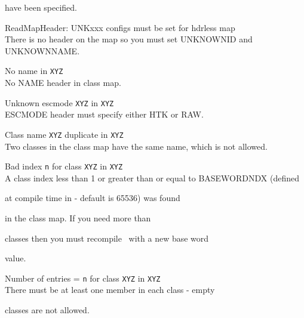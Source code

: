\begin{itemize}
\begin{itemize}
        have been specified.





 ReadMapHeader: UNKxxx configs must be set for hdrless map\\


        There is no header on the map so you must set UNKNOWNID and UNKNOWNNAME.





 No name in \texttt{XYZ}\\


        No NAME header in class map.





 Unknown escmode \texttt{XYZ} in \texttt{XYZ}\\


        ESCMODE header must specify either HTK or RAW.





 Class name  \texttt{XYZ} duplicate in \texttt{XYZ}\\


        Two classes in the class map have the same name, which is not allowed.





 Bad index \texttt{n} for class \texttt{XYZ} in \texttt{XYZ}\\


        A class index less than 1 or greater than or equal to BASEWORDNDX (defined


        at compile time in  - default is 65536) was found


        in the class map.  If you need more than 


        classes then you must recompile \HTK\ with a new base word


        value.





 Number of entries =  \texttt{n} for class \texttt{XYZ} in \texttt{XYZ}\\


        There must be at least one member in each class - empty


        classes are not allowed.






\end{itemize}
\end{itemize}

